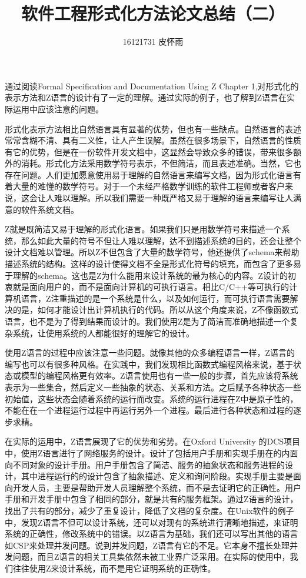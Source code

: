 \documentclass{article}
\author{16121731 皮怀雨}
\title{软件工程形式化方法论文总结（二）}
\begin{document}
\begin{CJK}{UTF8}{gbsn}
\maketitle
\begin{spacing}{1.4}
\renewcommand{\CJKglue}{\hskip 0.5pt}

通过阅读Formal Specification and Documentation Using Z Chapter 1,对形式化的表示方法和Z语言的设计有了一定的理解。通过实际的例子，也了解到Z语言在实际运用中应该注意的问题。

形式化表示方法相比自然语言具有显著的优势，但也有一些缺点。自然语言的表述常常含糊不清、具有二义性，让人产生误解。虽然在很多场景下，自然语言的性质有它的优势，但是在一份软件开发文档中，这显然会导致众多的错误，带来很多额外的消耗。形式化方法采用数学符号表示，不但简洁，而且表述准确。当然，它也存在问题。人们更加愿意使用易于理解的自然语言来编写文档，因为形式化语言有着大量的难懂的数学符号。对于一个未经严格数学训练的软件工程师或者客户来说，这会让人难以理解。所以我们需要一种既严格又易于理解的语言来编写让人满意的软件系统文档。

Z就是既简洁又易于理解的形式化语言。如果我们只是用数学符号来描述一个系统，那么如此大量的符号不但让人难以理解，达不到描述系统的目的，还会让整个设计文档难以管理。所以Z不但包含了大量的数学符号，他还提供了schema来帮助描述系统的结构。这样的设计使得文档不全是形式化符号的填充，而包含了更多易于理解的schema。这也是Z为什么能用来设计系统的最为核心的内容。Z设计的初衷就是面向用户的，而不是面向计算机的可执行语言。相比C/C++等可执行的计算机语言，Z注重描述的是一个系统是什么，以及如何运行，而可执行语言需要解决的是，如何才能设计出计算机执行的代码。所以从这个角度来说，Z不像函数式语言，也不是为了得到结果而设计的。我们使用Z是为了简洁而准确地描述一个复杂系统，让使用系统的人都能很好的理解它的设计。

使用Z语言的过程中应该注意一些问题。就像其他的众多编程语言一样，Z语言的编写也可以有很多种风格。在实践中，我们发现相比函数式编程风格来说，基于状态或模型的编程风格更有效率。Z语言使用也有一些一般的步骤，首先应该将系统表示为一些集合，然后定义一些抽象的状态、关系和方法。之后赋予各种状态一些初始值，这些状态会随着系统的运行而改变。系统的运行进程在Z中是原子性的，不能在在一个进程运行过程中再运行另外一个进程。最后进行各种状态和过程的逐步求精。

在实际的运用中，Z语言展现了它的优势和劣势。在Oxford University 的DCS项目中，使用Z语言进行了网络服务的设计。设计了包括用户手册和实现手册在的内面向不同对象的设计手册。用户手册包含了简洁、服务的抽象状态和服务进程的设计，其中进程运行的的设计包含了抽象描述、定义和询问阶段。实现手册主要是面向开发人员，主要是帮助开发人员理解整个系统，而不是去证明它的正确性。用户手册和开发手册中包含了相同的部分，就是共有的服务框架。通过Z语言的设计，找出了共有的部分，减少了重复设计，降低了文档的复杂度。在Unix软件的例子中，发现Z语言不但可以设计系统，还可以对现有的系统进行清晰地描述，来证明系统的正确性，修改系统中的错误。以Z语言为基础，我们还可以写出其他的语言如CSP来处理并发问题。说到并发问题，Z语言有它的不足。它本身不擅长处理并发问题，而且Z语言的相关工具集依然未被工业界广泛采用。在实际的使用中，我们往往使用Z来设计系统，而不是用它证明系统的正确性。


\end{spacing}
\end{CJK}
\end{document}
